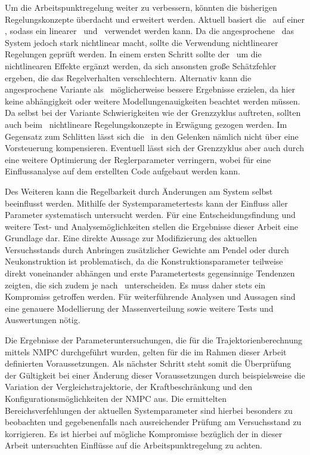 Um die Arbeitspunktregelung weiter zu verbessern, könnten die bisherigen Regelungskonzepte überdacht und erweitert werden.
Aktuell basiert die \aprg\ auf einer \lin, sodass ein linearer \zsr\ und \beob\ verwendet werden kann.
Da die angesprochene \crb\ das System jedoch stark nichtlinear macht, sollte die Verwendung nichtlinearer Regelungen geprüft werden.
In einem ersten Schritt sollte der \beob\ um die nichtlinearen Effekte ergänzt werden, da sich ansonsten große Schätzfehler ergeben, die das Regelverhalten verschlechtern.
Alternativ kann die angesprochene Variante \emph{\diff} als \ze\ möglicherweise bessere Ergebnisse erzielen, da hier keine \ap abhängigkeit oder weitere Modellungenauigkeiten beachtet werden müssen.
Da selbst bei der Variante \emph{\zm} Schwierigkeiten wie der Grenzzyklus auftreten, sollten auch beim \zsr\ nichtlineare Regelungskonzepte in Erwägung gezogen werden.
Im Gegensatz zum Schlitten lässt sich die \crb\ in den Gelenken nämlich nicht über eine Vorsteuerung kompensieren.
Eventuell lässt sich der Grenzzyklus aber auch durch eine weitere Optimierung der Reglerparameter verringern, wobei für eine Einflussanalyse auf dem erstellten Code aufgebaut werden kann.

Des Weiteren kann die Regelbarkeit durch Änderungen am System selbst beeinflusst werden.
Mithilfe der Systemparametertests kann der Einfluss aller Parameter systematisch untersucht werden.
Für eine Entscheidungsfindung und weitere Test- und Analysemöglichkeiten stellen die Ergebnisse dieser Arbeit eine Grundlage dar.
Eine direkte Aussage zur Modifizierung des aktuellen Versuchsstands durch Anbringen zusätzlicher Gewichte am Pendel oder durch Neukonstruktion  ist problematisch, da die Konstruktionsparameter teilweise direkt voneinander abhängen und erste Parametertests gegensinnige Tendenzen zeigten, die sich zudem je nach \ap\ unterscheiden.
Es muss daher stets ein Kompromiss getroffen werden.
Für weiterführende Analysen und Aussagen sind eine genauere Modellierung der Massenverteilung sowie weitere Tests und Auswertungen nötig.

Die Ergebnisse der Parameteruntersuchungen, die für die Trajektorienberechnung mittels NMPC durchgeführt wurden, gelten für die im Rahmen dieser Arbeit definierten Voraussetzungen. %
Als nächster Schritt steht somit die Überprüfung der Gültigkeit bei einer Änderung dieser Voraussetzungen durch beispielsweise die Variation der Vergleichstrajektorie, der Kraftbeschränkung und den Konfigurationsmöglichkeiten der NMPC aus. Die ermittelten Bereichsverfehlungen der aktuellen Systemparameter sind hierbei besonders zu beobachten und gegebenenfalls nach ausreichender Prüfung am Versuchsstand zu korrigieren. Es ist hierbei auf mögliche Kompromisse bezüglich der in dieser Arbeit untersuchten Einflüsse auf die Arbeitspunktregelung zu achten.

